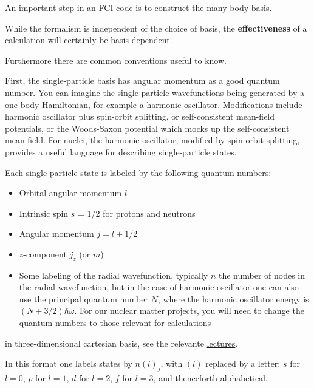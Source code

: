 \documentclass[%
twoside,                 %
final,                   %
10pt]{article}
\begin{document}
\noindent
An important step in an FCI code  is to construct the many-body basis.  

While the formalism is independent of the choice of basis, the \textbf{effectiveness} of a calculation 
will certainly be basis dependent. 

Furthermore there are common conventions useful to know.

First, the single-particle basis has angular momentum as a good quantum number.  You can 
imagine the single-particle wavefunctions being generated by a one-body Hamiltonian, 
for example a harmonic oscillator.  Modifications include harmonic oscillator plus 
spin-orbit splitting, or self-consistent mean-field potentials, or the Woods-Saxon potential which mocks 
up the self-consistent mean-field. 
For nuclei, the harmonic oscillator, modified by spin-orbit splitting, provides a useful language 
for describing single-particle states.


Each single-particle state is labeled by the following quantum numbers: 

\begin{itemize}
\item Orbital angular momentum $l$

\item Intrinsic spin $s$ = 1/2 for protons and neutrons

\item Angular momentum $j = l \pm 1/2$

\item $z$-component $j_z$ (or $m$)

\item Some labeling of the radial wavefunction, typically $n$ the number of nodes in  the radial wavefunction, but in the case of harmonic oscillator one can also use the principal quantum number $N$, where the harmonic oscillator energy is $(N+3/2)\hbar \omega$.  For our nuclear matter projects, you will need to change the quantum numbers to those relevant for calculations
\end{itemize}

\noindent
in three-dimensional cartesian basis, see the relevante \href{{https://github.com/NuclearTalent/Course2ManyBodyMethods/blob/master/doc/pub/cc/pdf/Lectures1-2_TALENT_NuclearMatter_GH.pdf}}{lectures}.


In this format one labels states by $n(l)_j$, with $(l)$ replaced by a letter:
$s$ for $l=0$, $p$ for $l=1$, $d$ for $l=2$, $f$ for $l=3$, and thenceforth alphabetical.
\end{document}

